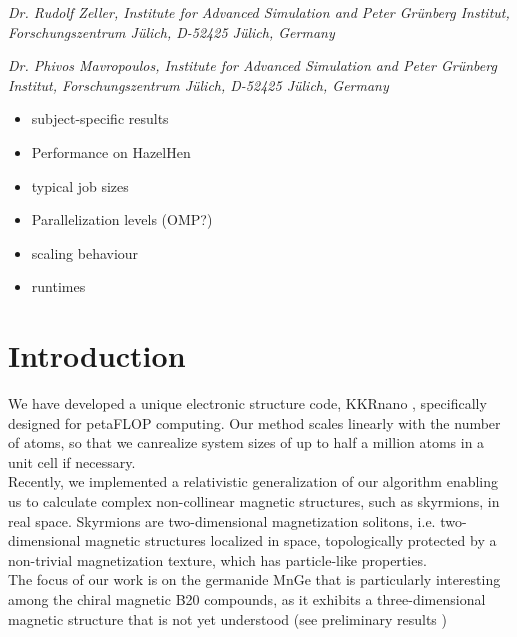\documentclass [a4paper, 12pt]{article}
\begin{document}
\phantom{MM} \textit{Dr. Rudolf Zeller,
Institute for Advanced Simulation and Peter Gr\"unberg Institut, Forschungszentrum J\"ulich, D-52425 J\"ulich, Germany
}

\phantom{MM} \textit{Dr. Phivos Mavropoulos,
Institute for Advanced Simulation and Peter Gr\"unberg Institut, Forschungszentrum J\"ulich, D-52425 J\"ulich, Germany
}



\newpage

\vfill
\tableofcontents
\vfill

\newpage

\begin{itemize}
	\item subject-specific results
	\item Performance on HazelHen
	\item typical job sizes
	\item Parallelization levels (OMP?)
	\item scaling behaviour \cite{brommel_juqueen_2017}
	\item runtimes
\end{itemize}

\section{Introduction}
We have developed a unique electronic structure code, 
KKRnano \cite{zeller_towards_2008,thiess_massively_2012},
specifically designed for petaFLOP computing. Our method scales linearly
with the number of atoms, so that we canrealize system sizes of up to 
half a million atoms in a unit cell if necessary.
\\
Recently, we implemented a relativistic generalization of our algorithm 
enabling us to calculate complex non-collinear magnetic structures, such as skyrmions,
in real space. Skyrmions are two-dimensional magnetization solitons, i.e. two-dimensional
magnetic structures localized in space, topologically protected by a non-trivial
magnetization texture, which has particle-like properties. 
\\
The focus of our work is on the germanide MnGe that is particularly
interesting among the chiral magnetic B20 compounds, as it exhibits a three-dimensional magnetic structure
that is not yet understood (see preliminary results
\cite{tanigaki_real-space_2015,rybakov_new_2016,bornemann_investigation_2017})
\end{document}

